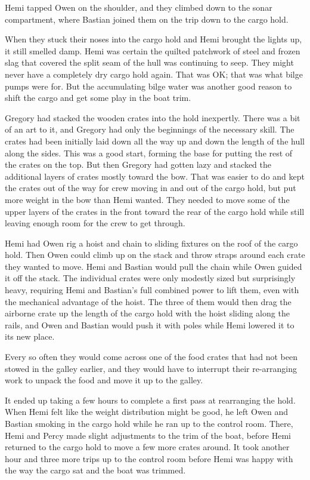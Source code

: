 \documentclass[
]{scrbook}
\begin{document}
Hemi tapped Owen on the shoulder, and they climbed down to the sonar
compartment, where Bastian joined them on the trip down to the cargo
hold.

When they stuck their noses into the cargo hold and Hemi brought the
lights up, it still smelled damp. Hemi was certain the quilted patchwork
of steel and frozen slag that covered the split seam of the hull was
continuing to seep. They might never have a completely dry cargo hold
again. That was OK; that was what bilge pumps were for. But the
accumulating bilge water was another good reason to shift the cargo and
get some play in the boat trim.

Gregory had stacked the wooden crates into the hold inexpertly. There
was a bit of an art to it, and Gregory had only the beginnings of the
necessary skill. The crates had been initially laid down all the way up
and down the length of the hull along the sides. This was a good start,
forming the base for putting the rest of the crates on the top. But then
Gregory had gotten lazy and stacked the additional layers of crates
mostly toward the bow. That was easier to do and kept the crates out of
the way for crew moving in and out of the cargo hold, but put more
weight in the bow than Hemi wanted. They needed to move some of the
upper layers of the crates in the front toward the rear of the cargo
hold while still leaving enough room for the crew to get through.

Hemi had Owen rig a hoist and chain to sliding fixtures on the roof of
the cargo hold. Then Owen could climb up on the stack and throw straps
around each crate they wanted to move. Hemi and Bastian would pull the
chain while Owen guided it off the stack. The individual crates were
only modestly sized but surprisingly heavy, requiring Hemi and Bastian's
full combined power to lift them, even with the mechanical advantage of
the hoist. The three of them would then drag the airborne crate up the
length of the cargo hold with the hoist sliding along the rails, and
Owen and Bastian would push it with poles while Hemi lowered it to its
new place.

Every so often they would come across one of the food crates that had
not been stowed in the galley earlier, and they would have to interrupt
their re-arranging work to unpack the food and move it up to the galley.

It ended up taking a few hours to complete a first pass at rearranging
the hold. When Hemi felt like the weight distribution might be good, he
left Owen and Bastian smoking in the cargo hold while he ran up to the
control room. There, Hemi and Percy made slight adjustments to the trim
of the boat, before Hemi returned to the cargo hold to move a few more
crates around. It took another hour and three more trips up to the
control room before Hemi was happy with the way the cargo sat and the
boat was trimmed.
\end{document}
